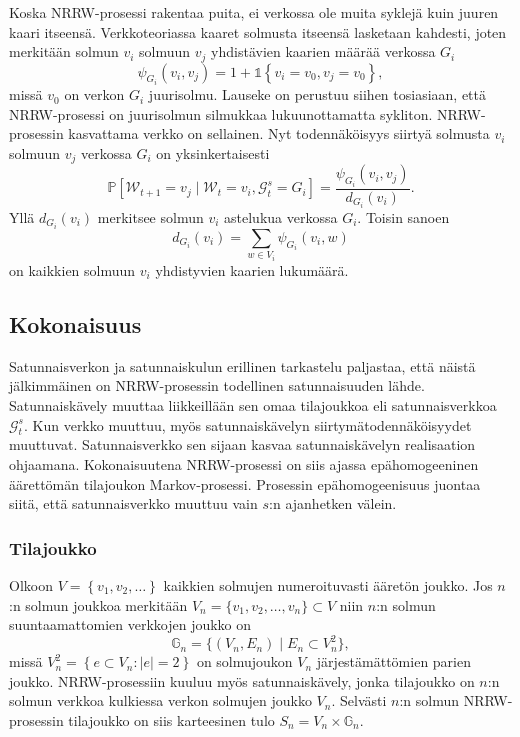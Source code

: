 \documentclass[finnish, 12pt, a4paper, sci, utf8, pdfa]{aaltothesis}
\newcommand{\Grandom}{\mathcal{G}}
\newcommand{\Wrandom}{\mathcal{W}}
\newcommand{\indicator}{\mathopen{\mathds{1}}}
\newcommand*{\prob}{\mathbb{P}}
\begin{document}
Koska NRRW-prosessi rakentaa puita, ei verkossa ole muita syklejä kuin juuren kaari itseensä. Verkkoteoriassa kaaret solmusta itseensä lasketaan kahdesti, joten merkitään solmun \( v_{i} \) solmuun \( v_{j} \) yhdistävien kaarien määrää verkossa $ G_{i} $
\begin{equation}
   \psi_{G_{i}}(v_{i}, v_{j}) = 1 + \indicator \left\{ v_{i} = v_{0}, v_{j} = v_{0} \right\},
   \label{equation:psi}
\end{equation}
missä $ v_{0} $ on verkon $ G_{i} $ juurisolmu. Lauseke on perustuu siihen tosiasiaan, että NRRW-prosessi on juurisolmun silmukkaa lukuunottamatta sykliton. NRRW-prosessin kasvattama verkko on sellainen. Nyt todennäköisyys siirtyä solmusta \( v_{i} \) solmuun \( v_{j} \) verkossa $ G_{i} $ on yksinkertaisesti
\begin{equation}
   \prob \left[ \Wrandom_{t+1} = v_{j} \mid \Wrandom_{t} = v_{i}, \Grandom_{t}^{s} = G_{i} \right] = \frac{\psi_{G_{i}}(v_{i}, v_{j})}{d_{G_{i}}(v_{i})}.
   \label{equation:verkko-tn}
\end{equation}
Yllä \( d_{G_{i}}(v_{i}) \) merkitsee solmun \( v_{i} \) astelukua verkossa $ G_{i} $. Toisin sanoen
\begin{equation}
   d_{G_{i}}(v_{i}) = \sum_{w \in V_{i}} \psi_{G_{i}}(v_{i}, w)
   \label{equation:asteluku}
\end{equation}
on kaikkien solmuun \( v_{i} \) yhdistyvien kaarien lukumäärä.

\subsection{Kokonaisuus}

Satunnaisverkon ja satunnaiskulun erillinen tarkastelu paljastaa, että näistä jälkimmäinen on NRRW-prosessin todellinen satunnaisuuden lähde. Satunnaiskävely muuttaa liikkeillään sen omaa tilajoukkoa eli satunnaisverkkoa \( \Grandom_{t}^{s} \). Kun verkko muuttuu, myös satunnaiskävelyn siirtymätodennäköisyydet muuttuvat. Satunnaisverkko sen sijaan kasvaa satunnaiskävelyn realisaation ohjaamana. Kokonaisuutena NRRW-prosessi on siis ajassa epähomogeeninen äärettömän tilajoukon Markov-prosessi. Prosessin epähomogeenisuus juontaa siitä, että satunnaisverkko muuttuu vain $ s $:n ajanhetken välein.

\subsubsection{Tilajoukko}

Olkoon $ V = \left\{ v_{1}, v_{2}, \ldots \right\} $ kaikkien solmujen numeroituvasti ääretön joukko. Jos $ n $:n solmun joukkoa merkitään $ V_{n} = \{ v_{1}, v_{2}, \ldots , v_{n} \} \subset V $ niin $ n $:n solmun suuntaamattomien verkkojen joukko on
\[
   \mathbb{G}_{n} = \{ (V_{n}, E_{n}) \mid E_{n} \subset V_{n}^{2}  \},
\]
missä $ V_{n}^{2} = \left\{ e \subset V_{n} : |e| = 2 \right\} $ on solmujoukon $ V_{n} $ järjestämättömien parien joukko. NRRW-prosessiin kuuluu myös satunnaiskävely, jonka tilajoukko on $ n $:n solmun verkkoa kulkiessa verkon solmujen joukko $ V_{n} $. Selvästi $ n $:n solmun NRRW-prosessin tilajoukko on siis karteesinen tulo $ S_{n} = V_{n} \times \mathbb{G}_{n} $.
\end{document}
